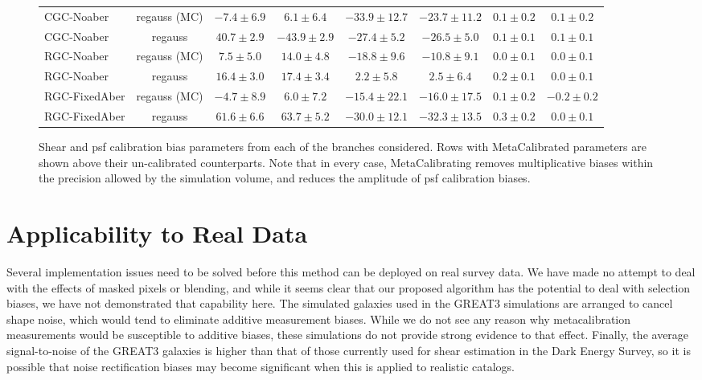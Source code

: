 \documentclass[iop]{emulateapj}
\begin{document}
\begin{figure}
{\begin{tabular}{l  c |cc | cc |cc }
CGC-Noaber & regauss (MC)  &  $-7.4\pm6.9$ & $6.1\pm6.4$  & $-33.9\pm12.7$ & $-23.7\pm11.2$ &  $0.1\pm0.2$ & $0.1\pm0.2$ \\
CGC-Noaber & regauss  &  $40.7\pm2.9$ & $-43.9\pm2.9$  & $-27.4\pm5.2$ & $-26.5\pm5.0$ &  $0.1\pm0.1$ & $0.1\pm0.1$ \\
RGC-Noaber & regauss (MC)&  $7.5\pm5.0$ & $14.0\pm4.8$  & $-18.8\pm9.6$ & $-10.8\pm9.1$ &  $0.0\pm0.1$ & $0.0\pm0.1$ \\
RGC-Noaber & regauss &  $16.4\pm3.0$ & $17.4\pm3.4$  & $2.2\pm5.8$ & $2.5\pm6.4$ &  $0.2\pm0.1$ & $0.0\pm0.1$ \\
RGC-FixedAber & regauss (MC) &  $-4.7\pm8.9$ & $6.0\pm7.2$  & $-15.4\pm22.1$ & $-16.0\pm17.5$ &  $0.1\pm0.2$ & $-0.2\pm0.2$ \\
RGC-FixedAber  & regauss  &  $61.6\pm6.6$ & $63.7\pm5.2$  & $-30.0\pm12.1$ & $-32.3\pm13.5$ &  $0.3\pm0.2$ & $0.0\pm0.1$ \\
\hline
\end{tabular}
}
\caption{Shear and psf calibration bias parameters from each of the
  branches considered. Rows with MetaCalibrated parameters are shown
  above their un-calibrated counterparts. Note that in every case,
  MetaCalibrating removes multiplicative biases within the precision
  allowed by the simulation volume, and reduces the amplitude of psf
  calibration biases.}
\label{table:results}
\end{figure}

\section{Applicability to Real Data}
Several implementation issues need to be solved before this method can
be deployed on real survey data. We have made no attempt to deal with
the effects of masked pixels or blending, and while it seems clear
that our proposed algorithm has the potential to deal with selection
biases, we have not demonstrated that capability here.  The simulated
galaxies used in the GREAT3 simulations are arranged to cancel shape
noise, which would tend to eliminate additive measurement
biases. While we do not see any reason why metacalibration
measurements would be susceptible to additive biases, these
simulations do not provide strong evidence to that effect. Finally,
the average signal-to-noise of the GREAT3 galaxies is higher than that
of those currently used for shear estimation in the Dark Energy
Survey, so it is possible that noise rectification biases may become
significant when this is applied to realistic catalogs.
\end{document}
